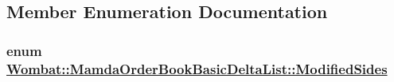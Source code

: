 \subsection{Member Enumeration Documentation}
\hypertarget{classWombat_1_1MamdaOrderBookBasicDeltaList_2edf0c7bea33ef46dc4071a9a4722ad1}{
\subsubsection[ModifiedSides]{\setlength{\rightskip}{0pt plus 5cm}enum \hyperlink{classWombat_1_1MamdaOrderBookBasicDeltaList_2edf0c7bea33ef46dc4071a9a4722ad1}{Wombat::Mamda\-Order\-Book\-Basic\-Delta\-List::Modified\-Sides}}}
\label{classWombat_1_1MamdaOrderBookBasicDeltaList_2edf0c7bea33ef46dc4071a9a4722ad1}


